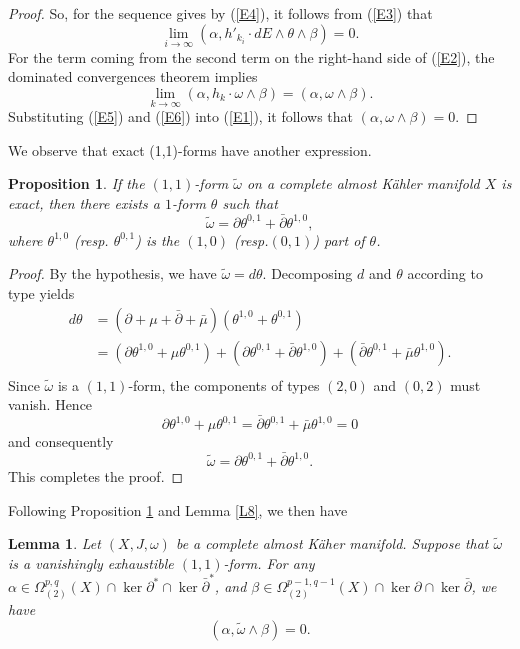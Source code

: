 \documentclass[12pt, twoside]{article}
\newtheorem{lemma}[theorem]{Lemma}
\newtheorem{proposition}[theorem]{Proposition}
\theoremstyle{definition}
\numberwithin{equation}{section}
\def \a {\alpha }
\def \b {\beta}
\def\w {\omega}
\def\Om{\Omega}
\def\pa{\partial}
\begin{document}
\begin{proof}
		So, for the sequence gives by (\ref{E4}), it follows from (\ref{E3}) that
		\begin{equation}\label{E5}
		\lim_{i\rightarrow\infty}(\a,h'_{k_{i}}\cdot dE\wedge\theta\wedge\b )=0.
		\end{equation}
		For the term coming from the second term on the right-hand side of (\ref{E2}), the dominated convergences theorem implies 
		\begin{equation}\label{E6}
		\lim_{k\rightarrow\infty}(\a,h_{k}\cdot\w\wedge\b)=(\a,\w\wedge\b).
		\end{equation}
		Substituting (\ref{E5}) and (\ref{E6}) into (\ref{E1}), it follows that $(\a,\w\wedge\b)=0$. 
	\end{proof}

We observe that exact (1,1)-forms have another expression.
	\begin{proposition}\label{P5}
		If the $(1,1)$-form $\tilde{\w}$ on a complete almost K\"{a}hler manifold $X$ is exact, then there exists a $1$-form $\theta$ such that
		\begin{equation*}
		\tilde{\w}=\pa\theta^{0,1}+\bar{\pa}\theta^{1,0},
		\end{equation*}
		where $\theta^{1,0}$ (resp. $\theta^{0,1}$) is the $(1,0)$ (resp.$(0,1)$) part of $\theta$. 
	\end{proposition}
	\begin{proof}
				By the hypothesis, we have $\tilde{\w}=d\theta$. Decomposing $d$ and $\theta$ according to type yields
		\begin{equation*}
		\begin{split}
		d\theta
		&=(\pa+\mu+\bar{\pa}+\bar{\mu})(\theta^{1,0}+\theta^{0,1})\\
		&=(\pa\theta^{1,0}+\mu\theta^{0,1})+(\pa\theta^{0,1}+\bar{\pa}\theta^{1,0})+(\bar{\pa}\theta^{0,1}+\bar{\mu}\theta^{1,0}).\\
		\end{split}
		\end{equation*}
		Since $\tilde{\w}$ is a $(1,1)$-form, the components of types $(2,0)$ and $(0,2)$ must vanish. Hence
		\[\pa\theta^{1,0}+\mu\theta^{0,1}=\bar{\pa}\theta^{0,1}+\bar{\mu}\theta^{1,0}=0\]
		and consequently
		\[\tilde{\w}=\pa\theta^{0,1}+\bar{\pa}\theta^{1,0}. \]
		This completes the proof.
	\end{proof}
	Following Proposition \ref{P5} and Lemma \ref{L8}, we then have
	\begin{lemma}\label{L3}\label{L4}
		Let  $(X,J,\w)$ be a complete almost K\"{a}her manifold. Suppose that $\tilde{\w}$ is a vanishingly exhaustible $(1,1)$-form. For any $\a\in\Om^{p,q}_{(2)}(X)\cap\ker \pa^{\ast}\cap\ker\bar{\pa}^{\ast}$, and $\b\in\Om^{p-1,q-1}_{(2)}(X)\cap\ker\pa\cap\ker\bar{\pa}$, we have
		\begin{equation*}
		(\a, \tilde{\w}\wedge \b)=0.
		\end{equation*}
	\end{lemma}
\end{document}
